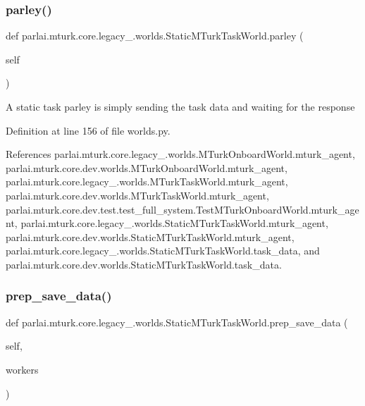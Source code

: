 \subsubsection{\texorpdfstring{parley()}{parley()}}
{\footnotesize\ttfamily def parlai.\+mturk.\+core.\+legacy\+\_.\+worlds.\+Static\+M\+Turk\+Task\+World.\+parley (\begin{DoxyParamCaption}\item[{}]{self }\end{DoxyParamCaption})}

\begin{DoxyVerb}A static task parley is simply sending the task data and waiting
for the response
\end{DoxyVerb}
 

Definition at line 156 of file worlds.\+py.



References parlai.\+mturk.\+core.\+legacy\+\_.\+worlds.\+M\+Turk\+Onboard\+World.\+mturk\+\_\+agent, parlai.\+mturk.\+core.\+dev.\+worlds.\+M\+Turk\+Onboard\+World.\+mturk\+\_\+agent, parlai.\+mturk.\+core.\+legacy\+\_.\+worlds.\+M\+Turk\+Task\+World.\+mturk\+\_\+agent, parlai.\+mturk.\+core.\+dev.\+worlds.\+M\+Turk\+Task\+World.\+mturk\+\_\+agent, parlai.\+mturk.\+core.\+dev.\+test.\+test\+\_\+full\+\_\+system.\+Test\+M\+Turk\+Onboard\+World.\+mturk\+\_\+agent, parlai.\+mturk.\+core.\+legacy\+\_.\+worlds.\+Static\+M\+Turk\+Task\+World.\+mturk\+\_\+agent, parlai.\+mturk.\+core.\+dev.\+worlds.\+Static\+M\+Turk\+Task\+World.\+mturk\+\_\+agent, parlai.\+mturk.\+core.\+legacy\+\_.\+worlds.\+Static\+M\+Turk\+Task\+World.\+task\+\_\+data, and parlai.\+mturk.\+core.\+dev.\+worlds.\+Static\+M\+Turk\+Task\+World.\+task\+\_\+data.

\mbox{\label{classparlai_1_1mturk_1_1core_1_1legacy__2018_1_1worlds_1_1StaticMTurkTaskWorld_a7f263553ea616c3ae36124e5fcab4dc2}} 
\subsubsection{\texorpdfstring{prep\+\_\+save\+\_\+data()}{prep\_save\_data()}}
{\footnotesize\ttfamily def parlai.\+mturk.\+core.\+legacy\+\_.\+worlds.\+Static\+M\+Turk\+Task\+World.\+prep\+\_\+save\+\_\+data (\begin{DoxyParamCaption}\item[{}]{self,  }\item[{}]{workers }\end{DoxyParamCaption})}

